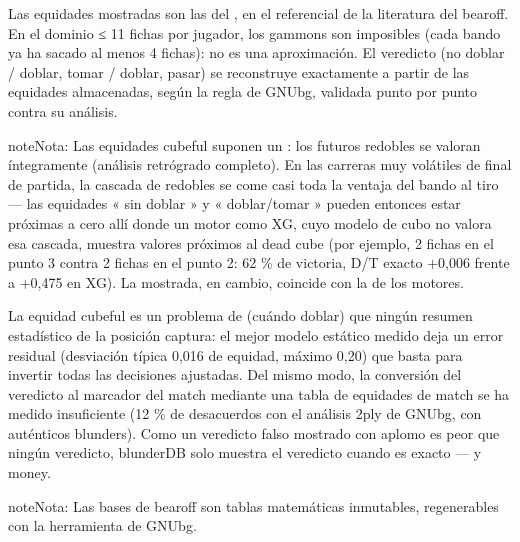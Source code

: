 \documentclass[letterpaper,10pt,spanish]{sphinxmanual}
\begin{document}
\sphinxAtStartPar
{} Las equidades mostradas son las del , en el referencial de la literatura del bearoff. En el dominio ≤ 11 fichas por jugador, los gammons son imposibles (cada bando ya ha sacado al menos 4 fichas): no es una aproximación. El veredicto (no doblar / doblar, tomar / doblar, pasar) se reconstruye exactamente a partir de las equidades almacenadas, según la regla de GNUbg, validada punto por punto contra su análisis.

\begin{sphinxadmonition}{note}{Nota:}
\sphinxAtStartPar
Las equidades cubeful suponen un : los futuros redobles se valoran íntegramente (análisis retrógrado completo). En las carreras muy volátiles de final de partida, la cascada de redobles se come casi toda la ventaja del bando al tiro — las equidades « sin doblar » y « doblar/tomar » pueden entonces estar próximas a cero allí donde un motor como XG, cuyo modelo de cubo no valora esa cascada, muestra valores próximos al dead cube (por ejemplo, 2 fichas en el punto 3 contra 2 fichas en el punto 2: 62 \% de victoria, D/T exacto +0,006 frente a +0,475 en XG). La  mostrada, en cambio, coincide con la de los motores.
\end{sphinxadmonition}

\sphinxAtStartPar
{} La equidad cubeful es un problema de  (cuándo doblar) que ningún resumen estadístico de la posición captura: el mejor modelo estático medido deja un error residual (desviación típica 0,016 de equidad, máximo 0,20) que basta para invertir todas las decisiones ajustadas. Del mismo modo, la conversión del veredicto al marcador del match mediante una tabla de equidades de match se ha medido insuficiente (12 \% de desacuerdos con el análisis 2\sphinxhyphen{}ply de GNUbg, con auténticos blunders). Como un veredicto falso mostrado con aplomo es peor que ningún veredicto, blunderDB solo muestra el veredicto cuando es exacto — y money.

\begin{sphinxadmonition}{note}{Nota:}
\sphinxAtStartPar
Las bases de bearoff son tablas matemáticas inmutables, regenerables con la herramienta  de GNUbg.
\end{sphinxadmonition}
\end{document}
